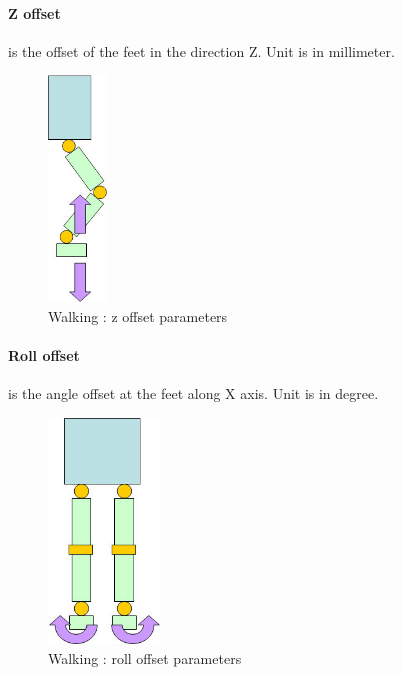\documentclass[a4paper, 12pt]{article}  		%
\begin{document}
\paragraph*{Z offset}
is the offset of the feet in the direction Z. Unit is in millimeter.
\begin{figure}[H]
\begin{center}
\includegraphics[height=6cm]{z_offset.jpg}
\caption{Walking : z offset parameters}
\label{z_offset}
\end{center}
\end{figure}

\paragraph*{Roll offset}
is the angle offset at the feet along X axis. Unit is in degree.
\begin{figure}[H]
\begin{center}
\includegraphics[height=6cm]{roll_offset.jpg}
\caption{Walking : roll offset parameters}
\label{roll_offset}
\end{center}
\end{figure}

\newpage
\end{document}
